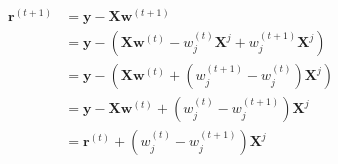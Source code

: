 \newcommand{\matrix}[1]{\mathbf{#1}}
\newcommand{\vector}[1]{\mathbf{#1}}
\newcommand{\X}{\matrix{X}}
\newcommand{\y}{\vector{y}}
\newcommand{\w}{\vector{w}}
\newcommand{\r}{\vector{r}}
\begin{align*}
\r^{(t+1)} &= \y - \X\w^{(t+1)} \\
&= \y - \left( \X\w^{(t)} - w_j^{(t)} \X^j + w_j^{(t+1)} \X^j \right) \\
&= \y - \left( \X\w^{(t)} + (w_j^{(t+1)} - w_j^{(t)} ) \X^j \right) \\
&= \y - \X\w^{(t)} +(w_j^{(t)} - w_j^{(t+1)} ) \X^j \\
&= \r^{(t)} + (w_j^{(t)} - w_j^{(t+1)}) \X^j \\
\end{align*}
